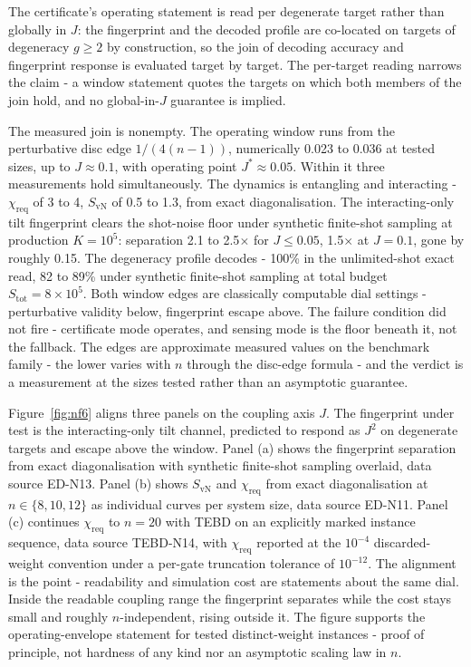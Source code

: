 The certificate's operating statement is read per degenerate target rather than globally in $J$: the fingerprint and the decoded profile are co-located on targets of degeneracy $g \ge 2$ by construction, so the join of decoding accuracy and fingerprint response is evaluated target by target. The per-target reading narrows the claim - a window statement quotes the targets on which both members of the join hold, and no global-in-$J$ guarantee is implied.

The measured join is nonempty. The operating window runs from the perturbative disc edge $1/(4(n-1))$, numerically 0.023 to 0.036 at tested sizes, up to $J \approx 0.1$, with operating point $J^{*} \approx 0.05$. Within it three measurements hold simultaneously. The dynamics is entangling and interacting - $\chi_{\mathrm{req}}$ of 3 to 4, $S_{\mathrm{vN}}$ of 0.5 to 1.3, from exact diagonalisation. The interacting-only tilt fingerprint clears the shot-noise floor under synthetic finite-shot sampling at production $K = 10^{5}$: separation 2.1 to 2.5$\times$ for $J \le 0.05$, 1.5$\times$ at $J = 0.1$, gone by roughly 0.15. The degeneracy profile decodes - 100\% in the unlimited-shot exact read, 82 to 89\% under synthetic finite-shot sampling at total budget $S_{\mathrm{tot}} = 8 \times 10^{5}$. Both window edges are classically computable dial settings - perturbative validity below, fingerprint escape above. The failure condition did not fire - certificate mode operates, and sensing mode is the floor beneath it, not the fallback. The edges are approximate measured values on the benchmark family - the lower varies with $n$ through the disc-edge formula - and the verdict is a measurement at the sizes tested rather than an asymptotic guarantee.

Figure~\ref{fig:nf6} aligns three panels on the coupling axis $J$. The fingerprint under test is the interacting-only tilt channel, predicted to respond as $J^{2}$ on degenerate targets and escape above the window. Panel (a) shows the fingerprint separation from exact diagonalisation with synthetic finite-shot sampling overlaid, data source ED-N13. Panel (b) shows $S_{\mathrm{vN}}$ and $\chi_{\mathrm{req}}$ from exact diagonalisation at $n \in \{8, 10, 12\}$ as individual curves per system size, data source ED-N11. Panel (c) continues $\chi_{\mathrm{req}}$ to $n = 20$ with TEBD on an explicitly marked instance sequence, data source TEBD-N14, with $\chi_{\mathrm{req}}$ reported at the $10^{-4}$ discarded-weight convention under a per-gate truncation tolerance of $10^{-12}$. The alignment is the point - readability and simulation cost are statements about the same dial. Inside the readable coupling range the fingerprint separates while the cost stays small and roughly $n$-independent, rising outside it. The figure supports the operating-envelope statement for tested distinct-weight instances - proof of principle, not hardness of any kind nor an asymptotic scaling law in $n$.

